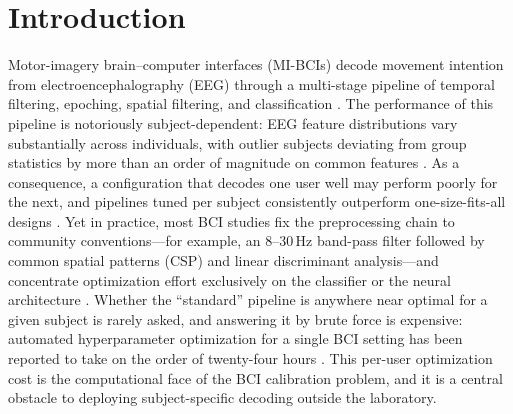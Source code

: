 
\section{Introduction}
\label{sec:intro}


Motor-imagery brain--computer interfaces (MI-BCIs) decode movement intention from electroencephalography (EEG) through a multi-stage pipeline of temporal filtering, epoching, spatial filtering, and classification \cite{CraikEtAl2019, SchirrmeisterEtAl2017}. The performance of this pipeline is notoriously subject-dependent: EEG feature distributions vary substantially across individuals, with outlier subjects deviating from group statistics by more than an order of magnitude on common features \cite{ZhangEtAl2024}. As a consequence, a configuration that decodes one user well may perform poorly for the next, and pipelines tuned per subject consistently outperform one-size-fits-all designs \cite{AnarakiEtAl2024, WangEtAl2026}. Yet in practice, most BCI studies fix the preprocessing chain to community conventions---for example, an 8--30\,Hz band-pass filter followed by common spatial patterns (CSP) and linear discriminant analysis---and concentrate optimization effort exclusively on the classifier or the neural architecture \cite{CraikEtAl2019, LeonEtAl2020}. Whether the ``standard'' pipeline is anywhere near optimal for a given subject is rarely asked, and answering it by brute force is expensive: automated hyperparameter optimization for a single BCI setting has been reported to take on the order of twenty-four hours \cite{BerdyshevEtAl2024}. This per-user optimization cost is the computational face of the BCI calibration problem, and it is a central obstacle to deploying subject-specific decoding outside the laboratory.


